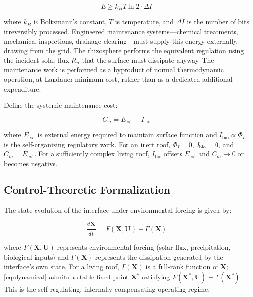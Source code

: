 \documentclass[12pt, a4paper]{article}
\theoremstyle{plain}
\theoremstyle{remark}
\begin{document}
\begin{equation}
E \geq k_B T \ln 2 \cdot \Delta I
\label{eq:landauer}
\end{equation}

\noindent where $k_B$ is Boltzmann's constant, $T$ is temperature, and $\Delta I$ is the number of bits irreversibly processed. Engineered maintenance systems---chemical treatments, mechanical inspections, drainage clearing---must supply this energy externally, drawing from the grid. The rhizosphere performs the equivalent regulation using the incident solar flux $R_n$ that the surface must dissipate anyway. The maintenance work is performed as a byproduct of normal thermodynamic operation, at Landauer-minimum cost, rather than as a dedicated additional expenditure.

Define the systemic maintenance cost:

\begin{equation}
C_m = E_{\text{ext}} - I_{\text{bio}}
\label{eq:maintenance}
\end{equation}

\noindent where $E_{\text{ext}}$ is external energy required to maintain surface function and $I_{\text{bio}} \propto \Phi_I$ is the self-organizing regulatory work. For an inert roof, $\Phi_I = 0$, $I_{\text{bio}} = 0$, and $C_m = E_{\text{ext}}$. For a sufficiently complex living roof, $I_{\text{bio}}$ offsets $E_{\text{ext}}$ and $C_m \to 0$ or becomes negative.

\subsection{Control-Theoretic Formalization}

The state evolution of the interface under environmental forcing is given by:

\begin{equation}
\frac{d\mathbf{X}}{dt} = F(\mathbf{X}, \mathbf{U}) - \Gamma(\mathbf{X})
\label{eq:dynamical}
\end{equation}

\noindent where $F(\mathbf{X}, \mathbf{U})$ represents environmental forcing (solar flux, precipitation, biological inputs) and $\Gamma(\mathbf{X})$ represents the dissipation generated by the interface's own state. For a living roof, $\Gamma(\mathbf{X})$ is a full-rank function of $\mathbf{X}$; \eqref{eq:dynamical} admits a stable fixed point $\mathbf{X}^*$ satisfying $F(\mathbf{X}^*, \mathbf{U}) = \Gamma(\mathbf{X}^*)$. This is the self-regulating, internally compensating operating regime.
\end{document}
